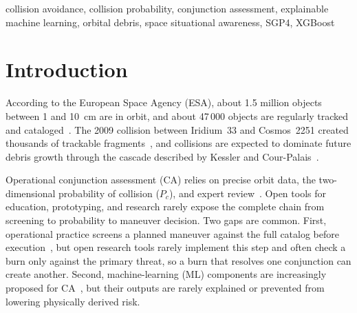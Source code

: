 \documentclass[conference]{IEEEtran}
\newcommand{\Pc}{P_c}
\begin{document}
\begin{IEEEkeywords}
collision avoidance, collision probability, conjunction assessment, explainable
machine learning, orbital debris, space situational awareness, SGP4, XGBoost
\end{IEEEkeywords}

\section{Introduction}
\label{sec:intro}

According to the European Space Agency (ESA), about 1.5 million objects
between 1 and 10~cm are in orbit, and about 47\,000 objects are regularly
tracked and cataloged~\cite{esa2026,esastats2026}. The 2009 collision between
Iridium~33 and Cosmos~2251 created thousands of trackable
fragments~\cite{kelso2009}, and collisions are expected to dominate future
debris growth through the cascade described by Kessler and
Cour-Palais~\cite{kessler1978,liou2006}.

Operational conjunction assessment (CA) relies on precise orbit data, the
two-dimensional probability of collision ($\Pc$), and expert
review~\cite{nasa2020}. Open tools for education, prototyping, and research
rarely expose the complete chain from screening to probability to maneuver
decision. Two gaps are common. First, operational practice screens a planned
maneuver against the full catalog before execution~\cite{nasa2020}, but open
research tools rarely implement this step and often check a burn only against
the primary threat, so a burn that resolves one conjunction can create another.
Second, machine-learning (ML) components are increasingly proposed for
CA~\cite{uriot2022,sanchez2021,stevenson2023}, but their outputs are rarely
explained or prevented from lowering physically derived risk.
\end{document}
